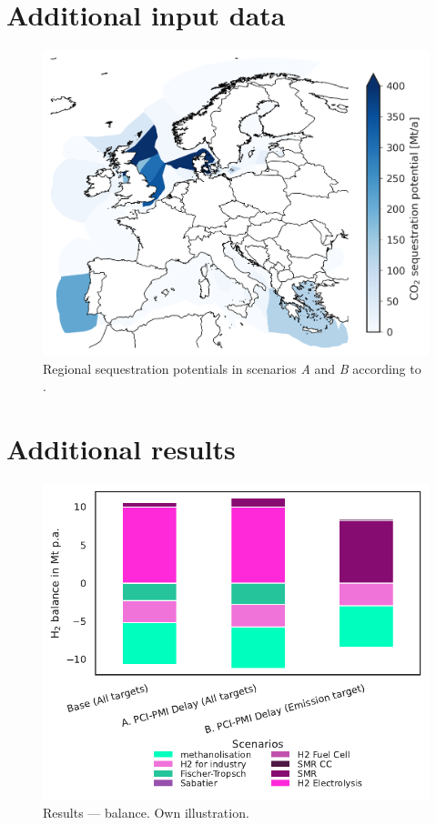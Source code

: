 \documentclass[final,5p,times,twocolumn]{elsarticle}
\let\autocite\cite
\begin{document}
\section{Additional input data}
\label{sec:app_additional}

\begin{figure}[h]
  \centering
  \includegraphics[width=\linewidth]{sequestration_map}
  \caption{Regional sequestration potentials in scenarios \textit{A} and \textit{B} according to \autocite{hofmannH2CO2Network2024}.}
  \label{fig:sequestration_map}
\end{figure}

\newpage
\section{Additional results}
\label{sec:app_hydrogen_and_carbon_balance}

\begin{figure}[h]
  \centering
  \includegraphics[width=\linewidth]{h2_balance}
  \caption{Results ---  balance. Own illustration.}
  \label{fig:h2_balance}
\end{figure}
\end{document}
